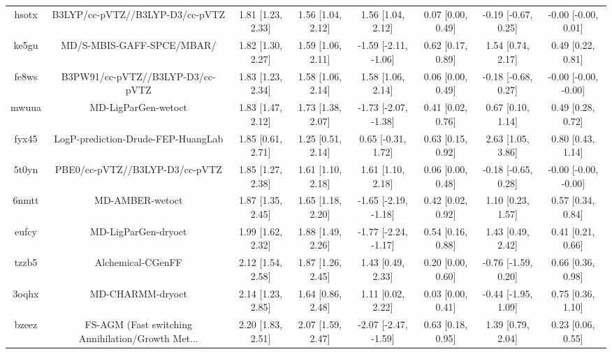 \documentclass{article}
\begin{document}
\begin{center}
\begin{longtable}{|cccccccc|}
 hsotx &                    B3LYP/cc-pVTZ//B3LYP-D3/cc-pVTZ &  1.81 [1.23, 2.33] &  1.56 [1.04, 2.12] &     1.56 [1.04, 2.12] &  0.07 [0.00, 0.49] &  -0.19 [-0.67, 0.25] &   -0.00 [-0.00, 0.01] \\
 ke5gu &                          MD/S-MBIS-GAFF-SPCE/MBAR/ &  1.82 [1.30, 2.27] &  1.59 [1.06, 2.11] &  -1.59 [-2.11, -1.06] &  0.62 [0.17, 0.89] &    1.54 [0.74, 2.17] &     0.49 [0.22, 0.81] \\
 fe8ws &                   B3PW91/cc-pVTZ//B3LYP-D3/cc-pVTZ &  1.83 [1.23, 2.34] &  1.58 [1.06, 2.14] &     1.58 [1.06, 2.14] &  0.06 [0.00, 0.49] &  -0.18 [-0.68, 0.27] &  -0.00 [-0.00, -0.00] \\
 mwuua &                                MD-LigParGen-wetoct &  1.83 [1.47, 2.12] &  1.73 [1.38, 2.07] &  -1.73 [-2.07, -1.38] &  0.41 [0.02, 0.76] &    0.67 [0.10, 1.14] &     0.49 [0.28, 0.72] \\
 fyx45 &                 LogP-prediction-Drude-FEP-HuangLab &  1.85 [0.61, 2.71] &  1.25 [0.51, 2.14] &    0.65 [-0.31, 1.72] &  0.63 [0.15, 0.92] &    2.63 [1.05, 3.86] &     0.80 [0.43, 1.14] \\
 5t0yn &                     PBE0/cc-pVTZ//B3LYP-D3/cc-pVTZ &  1.85 [1.27, 2.38] &  1.61 [1.10, 2.18] &     1.61 [1.10, 2.18] &  0.06 [0.00, 0.48] &  -0.18 [-0.65, 0.28] &  -0.00 [-0.00, -0.00] \\
 6nmtt &                                    MD-AMBER-wetoct &  1.87 [1.35, 2.45] &  1.65 [1.18, 2.20] &  -1.65 [-2.19, -1.18] &  0.42 [0.02, 0.92] &    1.10 [0.23, 1.57] &     0.57 [0.34, 0.84] \\
 eufcy &                                MD-LigParGen-dryoct &  1.99 [1.62, 2.32] &  1.88 [1.49, 2.26] &  -1.77 [-2.24, -1.17] &  0.54 [0.16, 0.88] &    1.43 [0.49, 2.42] &     0.41 [0.21, 0.66] \\
 tzzb5 &                                  Alchemical-CGenFF &  2.12 [1.54, 2.58] &  1.87 [1.26, 2.45] &     1.43 [0.49, 2.33] &  0.20 [0.00, 0.60] &  -0.76 [-1.59, 0.20] &     0.66 [0.36, 0.98] \\
 3oqhx &                                   MD-CHARMM-dryoct &  2.14 [1.23, 2.85] &  1.64 [0.86, 2.48] &     1.11 [0.02, 2.22] &  0.03 [0.00, 0.41] &  -0.44 [-1.95, 1.09] &     0.75 [0.36, 1.10] \\
 bzeez &  FS-AGM (Fast switching Annihilation/Growth Met... &  2.20 [1.83, 2.51] &  2.07 [1.59, 2.47] &  -2.07 [-2.47, -1.59] &  0.63 [0.18, 0.95] &    1.39 [0.79, 2.04] &     0.23 [0.06, 0.55] \\

\end{longtable}
\end{center}
\end{document}
